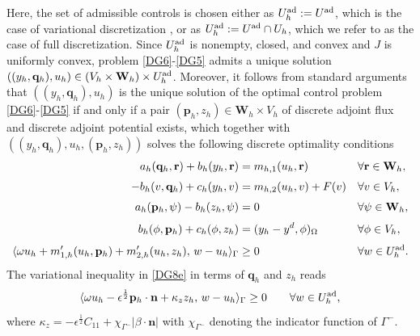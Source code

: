 \documentclass[a4paper,10pt]{article}
\newcommand{\Uad}{{U^{\textup{ad}}}}
\newcommand{\Uadh}{{U^{\textup{ad}}_h}}
\newcommand{\hF}{{\frac{1}{2}}}
\newcommand{\bq}{{\mathbf{q}}}
\newcommand{\br}{{\mathbf{r}}}
\newcommand{\bp}{{\mathbf{p}}}
\newcommand{\bn}{{\mathbf{n}}}
\newcommand{\bW}{{\mathbf{W}}}
\numberwithin{theorem}{section}
\newcommand{\x}[2][blue]{#2}
\begin{document}
\noindent Here, the set of admissible controls is chosen either as $\Uadh:= \Uad$, which is the case of variational discretization \cite{MHinze_2005a}, or as $\Uadh:=\Uad \cap U_h$, which we refer to as the case of full discretization. Since $\Uadh$ is nonempty,  closed, and convex and $J$ is uniformly convex, problem \eqref{DG6}-\eqref{DG5} admits a unique solution $((y_h,\bq_h),u_h)\in (V_h\times \bW_h)\times \Uadh$.
Moreover, it follows from standard arguments that $((y_h,\bq_h),u_h)$ is the unique solution of the optimal control problem \eqref{DG6}-\eqref{DG5} if and only if a pair $(\bp_h,z_h)\in \bW_h\times V_h$ of discrete adjoint flux and discrete adjoint potential exists, which together with $((y_h,\bq_h),u_h,(\bp_h,z_h))$ solves the following discrete optimality conditions
\begin{subequations}\label{DG8}
\begin{align}
a_h(\bq_h, \br) + b_h(y_h, \br) 
&= m_{h,1}(u_h, \br)
&& \forall \br \in \bW_h, \label{DG8a} \\[0.3em] 
-b_h(v, \bq_h) + c_h(y_h, v) 
&= m_{h,2}(u_h, v) + F(v)
&& \forall v \in V_h, \label{DG8b} \\[0.3em] 
a_h(\bp_h, \psi) - b_h(z_h, \psi) 
&= 0 
&& \forall \psi \in \bW_h, \label{DG8c} \\[0.3em] 
b_h(\phi, \bp_h) + c_h(\phi, z_h) 
&= (y_h - y^d, \phi)_\Omega
&& \forall \phi \in V_h, \label{DG8d} \\[0.3em] 
\langle \omega u_h + m'_{1,h}(u_h, \bp_h) + m'_{2,h}(u_h, z_h), \, w - u_h \rangle_\Gamma 
&\ge 0
&& \forall w \in \Uadh. \label{DG8e}
\end{align}
\end{subequations}
The variational inequality in \eqref{DG8e} in terms of $\bq_h$ and $z_h$ reads
\begin{equation}
\langle \omega u_h - \epsilon^{\hF} \bp_h \cdot \bn 
+ \kappa_z z_h, 
\, w - u_h \rangle_{\Gamma} \ge 0
\qquad \forall w \in \Uadh,
\end{equation}
where $\kappa_z =  -\epsilon^{\hF} C_{11} + \chi_{\Gamma^-} |\beta \cdot \bn|$  \x{with  $\chi_{\Gamma^-}$ denoting the indicator function of $\Gamma^-$.}
\end{document}

